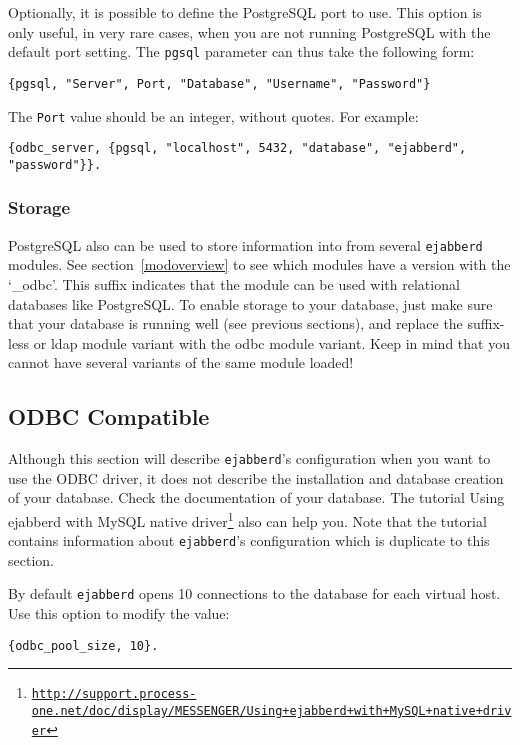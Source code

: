 \documentclass[a4paper,10pt]{book}
\newcommand{\ind}[1]{\begin{latexonly}\index{#1}\end{latexonly}}
\newcommand{\term}[1]{\texttt{#1}}
\newcommand{\ejabberd}{\texttt{ejabberd}}
\gdef\footahref#1#2{#2\footnote{\href{#1}{\texttt{#1}}}}
\begin{document}
Optionally, it is possible to define the PostgreSQL port to use. This
option is only useful, in very rare cases, when you are not running
PostgreSQL with the default port setting. The \term{pgsql} parameter
can thus take the following form:
\begin{verbatim}
{pgsql, "Server", Port, "Database", "Username", "Password"}
\end{verbatim}

The \term{Port} value should be an integer, without quotes. For example:
\begin{verbatim}
{odbc_server, {pgsql, "localhost", 5432, "database", "ejabberd", "password"}}.
\end{verbatim}

\subsubsection{Storage}
\label{pgsqlstorage}
\ind{PostgreSQL!storage}

PostgreSQL also can be used to store information into from several \ejabberd{}
modules. See section~\ref{modoverview} to see which modules have a version
with the `\_odbc'. This suffix indicates that the module can be used with
relational databases like PostgreSQL. To enable storage to your database, just
make sure that your database is running well (see previous sections), and
replace the suffix-less or ldap module variant with the odbc module variant.
Keep in mind that you cannot have several variants of the same module loaded!

\subsection{ODBC Compatible}
\label{odbc}
\ind{databases!ODBC}

Although this section will describe \ejabberd{}'s configuration when you want to
use the ODBC driver, it does not describe the installation and database creation
of your database. Check the documentation of your database. The tutorial \footahref{http://support.process-one.net/doc/display/MESSENGER/Using+ejabberd+with+MySQL+native+driver}{Using ejabberd with MySQL native driver} also can help you. Note that the tutorial
contains information about \ejabberd{}'s configuration which is duplicate to
this section.

By default \ejabberd{} opens 10 connections to the database for each virtual host.
Use this option to modify the value:
\begin{verbatim}
{odbc_pool_size, 10}.
\end{verbatim}
\end{document}
